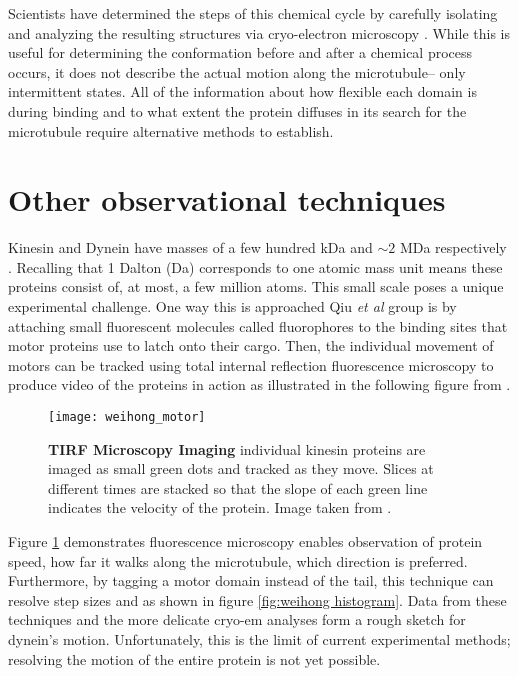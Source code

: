 Scientists have determined the steps of this chemical cycle by carefully isolating and analyzing the resulting structures via cryo-electron microscopy \cite{burgess2003dynein}. While this is useful for determining the conformation before and after a chemical process occurs, it does not describe the actual motion along the microtubule-- only intermittent states. All of the information about how flexible each domain is during binding and to what extent the protein diffuses in its search for the microtubule require alternative methods to establish.

\section{Other observational techniques} 
 Kinesin and Dynein have masses of a few hundred kDa and  $\sim2$ MDa respectively \cite{liao1998kinesin, johnson1983structure}. Recalling that 1 Dalton (Da) corresponds to one atomic mass unit means these proteins consist of, at most, a few million atoms. This small scale poses a unique experimental challenge. One way this is approached Qiu \textit{et al} group is by attaching small fluorescent molecules called fluorophores to the binding sites that motor proteins use to latch onto their cargo. Then, the individual movement of motors can be tracked using total internal reflection fluorescence microscopy to produce video of the proteins in action as illustrated in the following figure from \cite{qiu2012dynein}. 

\begin{figure}[!hbt]
	\centering
	\texttt{[image: weihong\_motor]}
	\caption[Stepping histogram]{\textbf{TIRF Microscopy Imaging} individual kinesin proteins are imaged as small green dots and tracked as they move. Slices at different times are stacked so that the slope of each green line indicates the velocity of the protein. Image taken from \cite{qiu2012dynein}.}
	\label{fig:weihong tirf}
\end{figure}

Figure \ref{fig:weihong tirf} demonstrates fluorescence microscopy enables observation of protein speed, how far it walks along the microtubule, which direction is preferred. Furthermore, by tagging a motor domain instead of the tail, this technique can resolve step sizes and as shown in figure \ref{fig:weihong histogram}. Data from these techniques and the more delicate cryo-em analyses form a rough sketch for dynein's motion. Unfortunately, this is the limit of current experimental methods; resolving the motion of the entire protein is not yet possible. 


